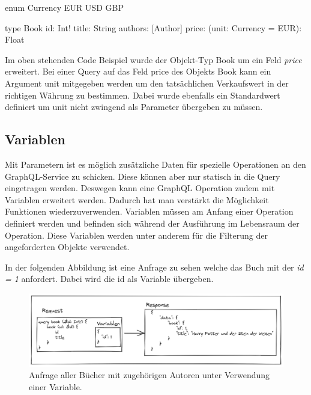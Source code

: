 \begin{JsCode}
enum Currency {
    EUR
    USD
    GBP
}

type Book {
    id: Int!
    title: String
    authors: [Author]
    price: (unit: Currency = EUR): Float
}
\end{JsCode}

Im oben stehenden Code Beispiel wurde der Objekt-Typ Book um ein Feld \textit{price} erweitert.
Bei einer Query auf das Feld price des Objekts Book kann ein Argument unit mitgegeben werden um den tatsächlichen Verkaufswert in der richtigen Währung zu bestimmen.
Dabei wurde ebenfalls ein Standardwert definiert um unit nicht zwingend als Parameter übergeben zu müssen.
\cite[S.62]{kress2020graphql}


\subsection{Variablen}
Mit Parametern ist es möglich zusätzliche Daten für spezielle Operationen an den GraphQL-Service zu schicken.
Diese können aber nur statisch in die Query eingetragen werden.
Deswegen kann eine GraphQL Operation zudem mit Variablen erweitert werden.
Dadurch hat man verstärkt die Möglichkeit Funktionen wiederzuverwenden.
Variablen müssen am Anfang einer Operation definiert werden und befinden sich während der Ausführung im Lebensraum der Operation.
Diese Variablen werden unter anderem für die Filterung der angeforderten Objekte verwendet.
\cite[Abs. 5.8]{graphqlOnline}
\newline

In der folgenden Abbildung ist eine Anfrage zu sehen welche das Buch mit der \textit{id = 1} anfordert. Dabei wird die id als Variable übergeben.

\begin{figure}[H]
    \includegraphics[width=\textwidth]{pics/book_request_with_parameter.png}
    \caption{Anfrage aller Bücher mit zugehörigen Autoren unter Verwendung einer Variable.}
\end{figure}


